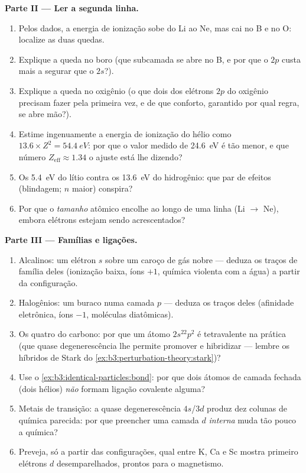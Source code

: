 \begin{problem}
\medskip\noindent\textbf{Parte II --- Ler a segunda linha.}
\begin{enumerate}[resume]
  \item Pelos dados, a energia de ionização sobe do Li ao Ne, mas cai
        no B e no O: localize as duas quedas.
  \item Explique a queda no boro (que subcamada se abre no B, e por que
        o $2p$ custa mais a segurar que o $2s$?).
  \item Explique a queda no oxigênio (o que dois dos elétrons $2p$ do
        oxigênio precisam fazer pela primeira vez, e de que conforto,
        garantido por qual regra, se abre mão?).
  \item Estime ingenuamente a energia de ionização do hélio como
        $13.6 \times Z^2 = \qty{54.4}{eV}$: por que o valor medido de
        \qty{24.6}{eV} é tão menor, e que número
        $Z_{\text{eff}} \approx 1.34$ o ajuste está lhe dizendo?
  \item Os \qty{5.4}{eV} do lítio contra os \qty{13.6}{eV} do
        hidrogênio: que par de efeitos (blindagem; $n$ maior) conspira?
  \item Por que o \emph{tamanho} atômico encolhe ao longo de uma linha
        (Li $\to$ Ne), embora elétrons estejam sendo acrescentados?
\end{enumerate}

\medskip\noindent\textbf{Parte III --- Famílias e ligações.}
\begin{enumerate}[resume]
  \item Alcalinos: um elétron $s$ sobre um caroço de gás nobre ---
        deduza os traços de família deles (ionização baixa, íons $+1$,
        química violenta com a água) a partir da configuração.
  \item Halogênios: um buraco numa camada $p$ --- deduza os traços
        deles (afinidade eletrônica, íons $-1$, moléculas diatômicas).
  \item Os quatro do carbono: por que um átomo $2s^22p^2$ é
        tetravalente na prática (que quase degenerescência lhe permite
        promover e hibridizar --- lembre os híbridos de Stark do
        \cref{ex:b3:perturbation-theory:stark})?
  \item Use o \cref{ex:b3:identical-particles:bond}: por que dois
        átomos de camada fechada (dois hélios) \emph{não} formam
        ligação covalente alguma?
  \item Metais de transição: a quase degenerescência $4s$/$3d$ produz
        dez colunas de química parecida: por que preencher uma camada
        $d$ \emph{interna} muda tão pouco a química?
  \item Preveja, só a partir das configurações, qual entre K, Ca e Sc
        mostra primeiro elétrons $d$ desemparelhados, prontos para o
        magnetismo.
\end{enumerate}


\end{problem}
